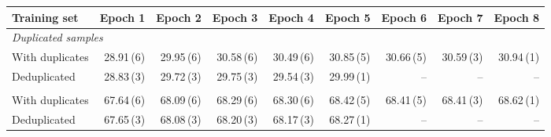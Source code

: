 \begin{tabular}{lrrrrrrrr}
\toprule
Training set & Epoch 1 & Epoch 2 & Epoch 3 & Epoch 4 & Epoch 5 & Epoch 6 & Epoch 7 & Epoch 8 \\
\midrule
\multicolumn{9}{l}{\emph{Duplicated samples}} \\
\quad With duplicates & 28.91\,(6) & 29.95\,(6) & 30.58\,(6) & 30.49\,(6) & 30.85\,(5) & 30.66\,(5) & 30.59\,(3) & 30.94\,(1) \\
\quad Deduplicated & 28.83\,(3) & 29.72\,(3) & 29.75\,(3) & 29.54\,(3) & 29.99\,(1) & -- & -- & -- \\
\addlinespace
\multicolumn{9}{l}{\emph{All other samples}} \\
\quad With duplicates & 67.64\,(6) & 68.09\,(6) & 68.29\,(6) & 68.30\,(6) & 68.42\,(5) & 68.41\,(5) & 68.41\,(3) & 68.62\,(1) \\
\quad Deduplicated & 67.65\,(3) & 68.08\,(3) & 68.20\,(3) & 68.17\,(3) & 68.27\,(1) & -- & -- & -- \\
\bottomrule
\end{tabular}

